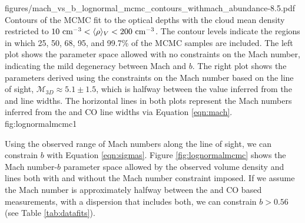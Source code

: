           {figures/mach_vs_b_lognormal_mcmc_contours_withmach_abundance-8.5.pdf}
{Contours of the MCMC fit to the \formaldehyde optical depths with the cloud
mean density restricted to $10~\textrm{cm}^{-3} < \langle\rho\rangle_V < 200~\textrm{cm}^{-3}$.  The contour
levels indicate the regions in which 25, 50, 68, 95, and 99.7\% of the MCMC
samples are included. The left plot shows the parameter space allowed with no
constraints on the Mach number, indicating the mild degeneracy between Mach and
$b$.  The right plot shows the parameters derived using the constraints on the
Mach number based on the \north line of sight, $\mathcal{M}_{3D}\approx5.1\pm1.5$, which is
halfway between the value inferred from the \formaldehyde and \thirteenco line widths.  
The horizontal lines in both plots represent the Mach numbers inferred from the
\formaldehyde and CO line widths via Equation \ref{eqn:mach}.
}{fig:lognormalmcmc}{1}%

Using the observed range of Mach numbers along the \north line of sight, we can
constrain $b$ with Equation \ref{eqn:sigmas}.  Figure \ref{fig:lognormalmcmc} shows the Mach number-$b$
parameter space allowed by the observed volume density and \formaldehyde lines
both with and without the Mach number constraint imposed.  If we assume the Mach number
is approximately halfway between the \formaldehyde and CO based measurements, with
a dispersion that includes both, we can constrain $b>0.56$ (see Table \ref{tab:datafits}).


